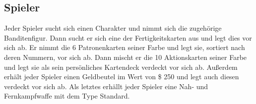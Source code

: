 \subsection{Spieler}

Jeder Spieler sucht sich einen Charakter und
nimmt sich die zugehörige Banditenfigur.
Dann sucht er sich eine der Fertigkeitskarten aus und legt dies vor sich ab.
Er nimmt die 6 Patronenkarten seiner
Farbe und legt sie, sortiert nach deren Nummern, vor sich ab.
Dann mischt er die 10 Aktionskarten seiner Farbe
und legt sie als sein persönliches Kartendeck verdeckt vor sich ab.
Außerdem erhält jeder Spieler einen Geldbeutel im
Wert von \$ 250 und legt auch diesen verdeckt vor sich ab.
Als letztes erhällt jeder Spieler eine Nah- und Fernkampfwaffe mit dem
Type Standard.